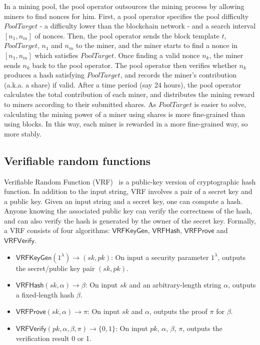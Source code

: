 In a mining pool, the pool operator outsources the mining process by allowing miners to find nonces for him.
First, a pool operator specifies the pool difficulty $PoolTarget$ - a difficulty lower than the blockchain network - and a search interval $[n_1, n_m]$ of nonces.
Then, the pool operator sends the block template $t$, $PoolTarget$, $n_1$ and $n_m$ to the miner, and the miner starts to find a nonce in $[n_1, n_m]$ which satisfies $PoolTarget$.
Once finding a valid nonce $n_k$, the miner sends $n_k$ back to the pool operator.
The pool operator then verifies whether $n_k$ produces a hash satisfying $PoolTarget$, and records the miner's contribution (a.k.a. a share) if valid.
After a time period (say 24 hours), the pool operator calculates the total contribution of each miner, and distributes the mining reward to miners according to their submitted shares.
As $PoolTarget$ is easier to solve, calculating the mining power of a miner using shares is more fine-grained than using blocks.
In this way, each miner is rewarded in a more fine-grained way, so more stably.


\subsection{Verifiable random functions}

Verifiable Random Function (VRF)~\cite{micali1999verifiable} is a public-key version of cryptographic hash function.
In addition to the input string, VRF involves a pair of a secret key and a public key.
Given an input string and a secret key, one can compute a hash.
Anyone knowing the associated public key can verify the correctness of the hash, and can also verify the hash is generated by the owner of the secret key.
Formally, a VRF consists of four algorithms: $\mathsf{VRFKeyGen}$, $\mathsf{VRFHash}$, $\mathsf{VRFProve}$ and $\mathsf{VRFVerify}$.

\begin{itemize}
    \item $\mathsf{VRFKeyGen}(1^{\lambda}) \to (sk, pk)$: On input a security parameter $1^{\lambda}$, outputs the secret/public key pair $(sk, pk)$.
    \item $\mathsf{VRFHash}(sk, \alpha) \to \beta $: On input $sk$ and an arbitrary-length string $\alpha$, outputs a fixed-length hash $\beta$.
    \item $\mathsf{VRFProve}(sk, \alpha) \to \pi$: On input $sk$ and $\alpha$, outputs the proof $\pi$ for $\beta$.
    \item $\mathsf{VRFVerify}(pk, \alpha, \beta, \pi) \to \{0, 1\}$: On input $pk$, $\alpha$, $\beta$, $\pi$, outputs the verification result 0 or 1.
\end{itemize}

